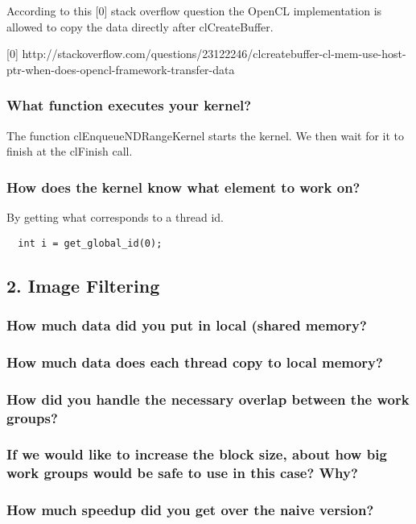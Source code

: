 \documentclass[a4paper,12pt]{article}
\begin{document}
According to this [0] stack overflow question the OpenCL implementation is allowed to copy the data directly after clCreateBuffer.

[0] http://stackoverflow.com/questions/23122246/clcreatebuffer-cl-mem-use-host-ptr-when-does-opencl-framework-transfer-data


\subsubsection{What function executes your kernel?}

The function clEnqueueNDRangeKernel starts the kernel. We then wait for it to finish at the clFinish call.


\subsubsection{How does the kernel know what element to work on?}

By getting what corresponds to a thread id.

\begin{lstlisting}
  int i = get_global_id(0);
\end{lstlisting}



\subsection{2. Image Filtering}

\subsubsection{How much data did you put in local (shared memory?}

\subsubsection{How much data does each thread copy to local memory?}

\subsubsection{How did you handle the necessary overlap between the work groups?}

\subsubsection{If we would like to increase the block size, about how big work groups would be safe to use in this case? Why?}

\subsubsection{How much speedup did you get over the naive version?}
\end{document}

